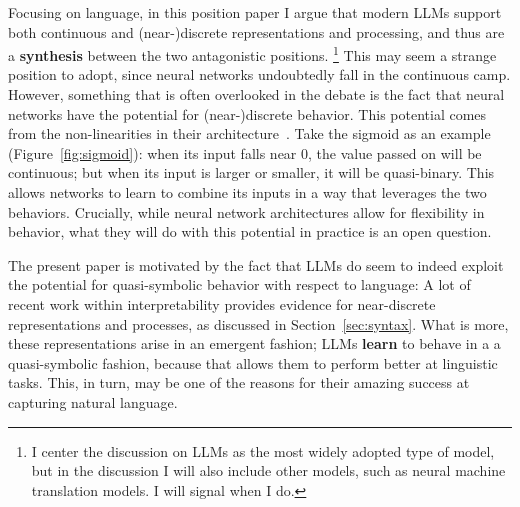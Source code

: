 Focusing on language, in this position paper I argue that modern LLMs support both continuous and (near-)discrete representations and processing, and thus are a \textbf{synthesis} between the two antagonistic positions.
\footnote{I center the discussion on LLMs as the most widely adopted type of model, but in the discussion I will also include other models, such as neural machine translation models. I will signal when I do.}
This may seem a strange position to adopt, since neural networks undoubtedly fall in the continuous camp.
However, something that is often overlooked in the debate is the fact that neural networks have the potential for (near-)discrete behavior.
This potential comes from the non-linearities in their architecture~\cite{minsky1988perceptrons}.
Take the sigmoid as an example (Figure~\ref{fig:sigmoid}): when its input falls near 0, the value passed on will be continuous; but when its input is larger or smaller, it will be quasi-binary.
This allows networks to learn to combine its inputs in a way that leverages the two behaviors.
Crucially, while neural network architectures allow for flexibility in behavior, what they will do with this potential in practice is an open question.

The present paper is motivated by the fact that LLMs do seem to indeed exploit the potential for quasi-symbolic behavior with respect to language: A lot of recent work within interpretability provides evidence for near-discrete representations and processes, as discussed in Section~\ref{sec:syntax}.
What is more, these representations arise in an emergent fashion; LLMs \textbf{learn} to behave in a a quasi-symbolic fashion, because that allows them to perform better at linguistic tasks.
This, in turn, may be one of the reasons for their amazing success at capturing natural language.
